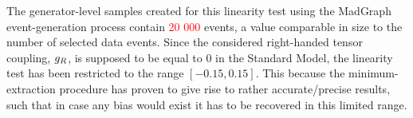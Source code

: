 The generator-level samples created for this linearity test using the MadGraph event-generation process contain \textcolor{red}{20 000} events, a value comparable in size to the number of selected data events. 
Since the considered right-handed tensor coupling, $g_{R}$, is supposed to be equal to $0$ in the Standard Model, the linearity test has been restricted to the range $\left[-0.15, 0.15\right]$.
This because the minimum-extraction procedure has proven to give rise to rather accurate/precise results, such that in case any bias would exist it has to be recovered in this limited range.
\\
\\
%
%
